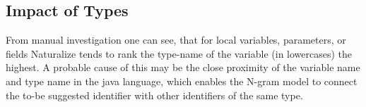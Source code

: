 \subsection{Impact of Types}
From manual investigation one can see, that for local variables, parameters, or fields Naturalize tends to rank the type-name of the variable (in lowercases) the highest. A probable cause of this may be the close proximity of the variable name and type name in the java language, which enables the N-gram model to connect the to-be suggested identifier with other identifiers of the same type. 